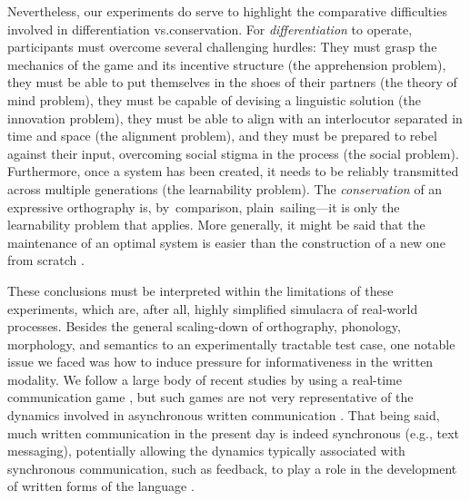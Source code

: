 \documentclass[doc,biblatex]{apa7}
\begin{document}
Nevertheless, our experiments do serve to highlight the comparative difficulties involved in differentiation vs.\@ conservation. For \textit{differentiation} to operate, participants must overcome several challenging hurdles: They must grasp the mechanics of the game and its incentive structure (the apprehension problem), they must be able to put themselves in the shoes of their partners (the theory of mind problem), they must be capable of devising a linguistic solution (the innovation problem), they must be able to align with an interlocutor separated in time and space (the alignment problem), and they must be prepared to rebel against their input, overcoming social stigma in the process (the social problem). Furthermore, once a system has been created, it needs to be reliably transmitted across multiple generations (the learnability problem). The \textit{conservation} of an expressive orthography is, by~comparison, plain~sailing---it is only the learnability problem that applies. More generally, it might be said that the maintenance of an optimal system is easier than the construction of a new one from scratch \parencite[see also][]{Smith:2002}.

These conclusions must be interpreted within the limitations of these experiments, which are, after all, highly simplified simulacra of real-world processes. Besides the general scaling-down of orthography, phonology, morphology, and semantics to an experimentally tractable test case, one notable issue we faced was how to induce pressure for informativeness in the written modality. We follow a large body of recent studies by using a real-time communication game \parencite[e.g.,][]{Carr:2017, Kanwal:2017, Kirby:2015, Raviv:2018, Saldana:2019, Silvey:2019, Winters:2015}, but such games are not very representative of the dynamics involved in asynchronous written communication \parencite[although see][for some approaches]{Winters:2019}. That being said, much written communication in the present day is indeed synchronous (e.g., text messaging), potentially allowing the dynamics typically associated with synchronous communication, such as feedback, to play a role in the development of written forms of the language \parencite{Lupyan:2016}.
\end{document}
